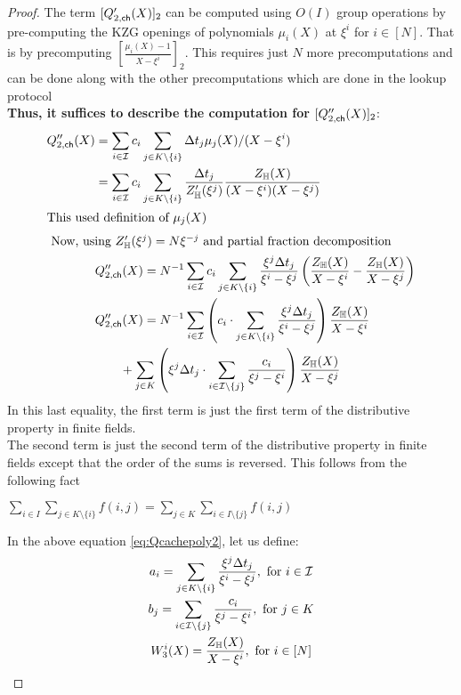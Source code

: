 \begin{proof}
    The term $[Q'_{2,\mathsf{ch}}({X})]_2$ can be computed using $O(I)$ group operations by pre-computing the
    \textsf{KZG} openings of polynomials $\mu_i(X)$ at $\xi^i$ for $i\in [N]$. That is by precomputing $[\frac{\mu_i(X)-1}{X-\xi^i}]_2$. This requires just $N$ more precomputations and can be done along with the other precomputations which are done in the lookup protocol\\

    \textbf{Thus, it suffices to describe the computation for $[Q''_{2,\mathsf{ch}}({X})]_2$}:
    \begin{align}\label{eq:Qcachepoly2}
    Q''_{2,\mathsf{ch}}({X}) &= \sum_{i\in \mathcal{I}}c_i\sum_{j\in K\setminus \{i\}} \Delta t_j\mu_j(X)/(X-\xi^i) \nonumber \\
    &= \sum_{i\in\mathcal{I}}c_i\sum_{j\in K\setminus \{i\}}\frac{\Delta t_j}{Z_{\mathbb{H}}'(\xi^j)} \frac{Z_{\mathbb{H}}(X)}{(X-\xi^i)(X-\xi^j)} \nonumber \\
    \intertext{This used definition of $\mu_j(X)$}
    \intertext{ Now, using $Z_{\mathbb{H}}'(\xi^j)=N\xi^{-j}$ and partial fraction decomposition}
    &Q''_{2,\mathsf{ch}}({X})= N^{-1}\sum_{i\in\mathcal{I}}c_i\sum_{j\in K\setminus \{i\}}\frac{\xi^j\Delta t_j}{\xi^i-\xi^j}
    \left(\frac{Z_{\mathbb{H}}(X)}{X-\xi^i} - \frac{Z_{\mathbb{H}}(X)}{X-\xi^j}\right) \nonumber \\
    &Q''_{2,\mathsf{ch}}({X})= N^{-1}\sum_{i\in\mathcal{I}}\left(c_i\cdot \sum_{j\in K\setminus \{i\}} \frac{\xi^j\Delta t_j}{\xi^i-\xi^j}\right)\frac{Z_{\mathbb{H}}(X)}{X-\xi^i} \nonumber \\
    &\qquad + \sum_{j\in K}\left(\xi^j\Delta t_j\cdot \sum_{i\in \mathcal{I}\setminus \{j\}}\frac{c_i}{\xi^j-\xi^i}\right)\frac{Z_{\mathbb{H}}(X)}{X-\xi^j}
    \end{align}
    In this last equality, the first term is just the first term of the distributive property in finite fields.\\
    The second term is just the second term of the distributive property in finite fields except that the order of the sums is reversed. This follows from the following fact \\

    \begin{fact}
        $\sum_{i \in I} \sum_{j \in K \setminus \{i\}} f(i,j)=\sum_{j \in K} \sum_{i \in I \setminus \{j\}} f(i,j) $
    \end{fact}

    In the above equation \eqref{eq:Qcachepoly2}, let us define:
    \begin{gather*}
        a_i = \sum_{j\in K\setminus \{i\}}\frac{\xi^j\Delta t_j}{\xi^i-\xi^j}, \text{ for } i\in \mathcal{I} \\
        b_j=  \sum_{i\in \mathcal{I}\setminus \{j\}}\frac{c_i}{\xi^j - \xi^i}, \text{ for } j\in K \\
        W_3^i(X) = \frac{Z_{\mathbb{H}}(X)}{X-\xi^i}, \text{ for } i\in [N]
    \end{gather*}



\end{proof}
